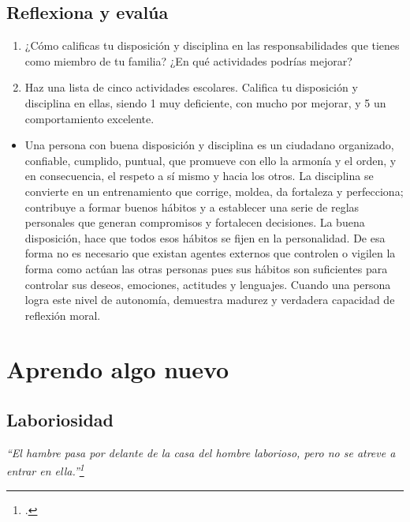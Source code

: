 \documentclass[10pt,twoside]{article}
\begin{document}
\subsection*{Reflexiona y eval\'{u}a}
 \begin{enumerate}
 \item ¿Cómo calificas tu disposición y disciplina en las
responsabilidades que tienes como miembro de tu familia?
¿En qué actividades podrías mejorar?
\item Haz una lista de cinco actividades escolares. Califica tu
disposición y disciplina en ellas, siendo 1 muy deficiente, con
mucho por mejorar, y 5 un comportamiento excelente.
 \end{enumerate}
 \begin{itemize}
 \item Una persona con buena disposición y disciplina es un
ciudadano organizado, confiable, cumplido, puntual,
que promueve con ello la armonía y el orden, y en
consecuencia, el respeto a sí mismo y hacia los otros.
La disciplina se convierte en un entrenamiento que
corrige, moldea, da fortaleza y perfecciona; contribuye
a formar buenos hábitos y a establecer una serie de
reglas personales que generan compromisos y fortalecen
decisiones. La buena disposición, hace que todos esos
hábitos se fijen en la personalidad. De esa forma no es
necesario que existan agentes externos que controlen
o vigilen la forma como actúan las otras personas pues
sus hábitos son suficientes para controlar sus deseos,
emociones, actitudes y lenguajes. Cuando una persona
logra este nivel de autonomía, demuestra madurez y
verdadera capacidad de reflexión moral.
 \end{itemize}
 \section*{Aprendo algo nuevo}
 \subsection*{Laboriosidad}
 \emph{“El hambre pasa por delante de la casa del hombre laborioso,
pero no se atreve a entrar en ella.”\footcite{Benjamín Franklin
}}
\end{document}
